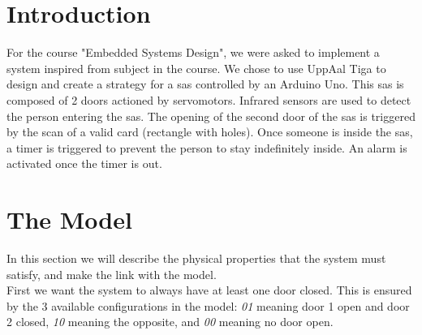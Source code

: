 

 

\thispagestyle{empty}

\titleTH %

\newpage

\tableofcontents
\newpage

\section{Introduction}
For the course "Embedded Systems Design", we were asked to implement a system inspired from subject in the course. We chose to use UppAal Tiga to design and create a strategy for a sas controlled by an Arduino Uno. This sas is composed of 2 doors actioned by servomotors. Infrared sensors are used to detect the person entering the sas. The opening of the second door of the sas is triggered by the scan of a valid card (rectangle with holes). Once someone is inside the sas, a timer is triggered to prevent the person to stay indefinitely inside. An alarm is activated once the timer is out.

\section{The Model}

In this section we will describe the physical properties that the system must satisfy, and make the link with the model.\\

First we want the system to always have at least one door closed. This is ensured by the 3 available configurations in the model: \emph{01} meaning door 1 open and door 2 closed, \emph{10} meaning the opposite, and \emph{00} meaning no door open.\\

